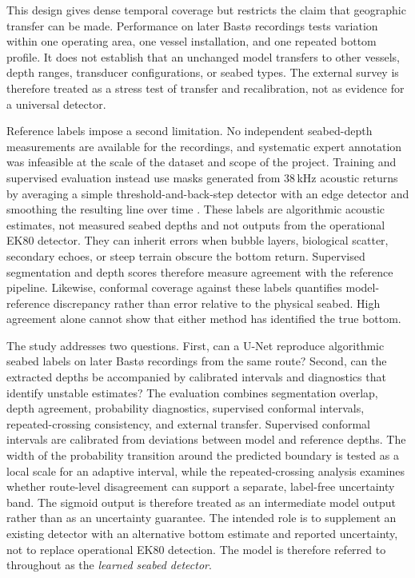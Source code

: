This design gives dense temporal coverage but restricts the claim that geographic transfer can be made. Performance on later Bast\o{} recordings tests variation within one operating area, one vessel installation, and one repeated bottom profile. It does not establish that an unchanged model transfers to other vessels, depth ranges, transducer configurations, or seabed types. The external survey is therefore treated as a stress test of transfer and recalibration, not as evidence for a universal detector.

Reference labels impose a second limitation. No independent seabed-depth measurements are available for the recordings, and systematic expert annotation was infeasible at the scale of the dataset and scope of the project. Training and supervised evaluation instead use masks generated from 38\,kHz acoustic returns by averaging a simple threshold-and-back-step detector with an edge detector and smoothing the resulting line over time \cite{crimac_classifiers_bottom}. These labels are algorithmic acoustic estimates, not measured seabed depths and not outputs from the operational EK80 detector. They can inherit errors when bubble layers, biological scatter, secondary echoes, or steep terrain obscure the bottom return. Supervised segmentation and depth scores therefore measure agreement with the reference pipeline. Likewise, conformal coverage against these labels quantifies model-reference discrepancy rather than error relative to the physical seabed. High agreement alone cannot show that either method has identified the true bottom.

The study addresses two questions. First, can a U-Net reproduce algorithmic seabed labels on later Bast\o{} recordings from the same route? Second, can the extracted depths be accompanied by calibrated intervals and diagnostics that identify unstable estimates? The evaluation combines segmentation overlap, depth agreement, probability diagnostics, supervised conformal intervals, repeated-crossing consistency, and external transfer. Supervised conformal intervals are calibrated from deviations between model and reference depths. The width of the probability transition around the predicted boundary is tested as a local scale for an adaptive interval, while the repeated-crossing analysis examines whether route-level disagreement can support a separate, label-free uncertainty band. The sigmoid output is therefore treated as an intermediate model output rather than as an uncertainty guarantee. The intended role is to supplement an existing detector with an alternative bottom estimate and reported uncertainty, not to replace operational EK80 detection. The model is therefore referred to throughout as the \emph{learned seabed detector}.


